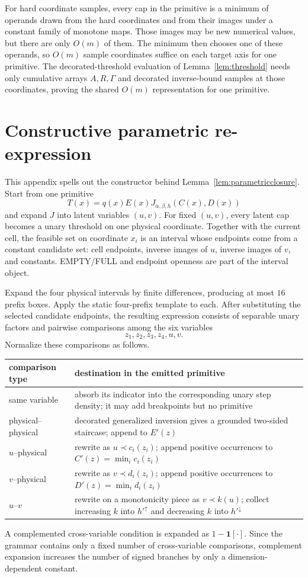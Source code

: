 \documentclass[12pt,a4paper]{article}
\theoremstyle{definition}
\newcommand{\1}{\mathbf 1}
\begin{document}
For hard coordinate samples, every cap in the primitive is a minimum of operands drawn from the hard coordinates and from their images under a constant family of monotone maps.  Those images may be new numerical values, but there are only $O(m)$ of them.  The minimum then chooses one of these operands, so $O(m)$ sample coordinates suffice on each target axis for one primitive. The decorated-threshold evaluation of Lemma~\ref{lem:threshold} needs only cumulative arrays $A,R,\Gamma$ and decorated inverse-bound samples at those coordinates, proving the shared $O(m)$ representation for one primitive.

\section{Constructive parametric re-expression}              \label{app:closure}

This appendix spells out the constructor behind Lemma~\ref{lem:parametricclosure}.  Start from one primitive
\[
T(x)=q(x)E(x)J_{\alpha,\beta,h}(C(x),D(x))
\]
and expand $J$ into latent variables $(u,v)$.  For fixed $(u,v)$, every latent cap becomes a unary threshold on one physical coordinate.  Together with the current cell, the feasible set on coordinate $x_i$ is an interval whose endpoints come from a constant candidate set: cell endpoints, inverse images of $u$, inverse images of $v$, and constants.  EMPTY/FULL and endpoint openness are part of the interval object.

Expand the four physical intervals by finite differences, producing at most $16$ prefix boxes.  Apply the static four-prefix template to each.  After substituting the selected candidate endpoints, the resulting expression consists of separable unary factors and pairwise comparisons among the six variables
\[
z_1,z_2,z_3,z_4,u,v.
\]
Normalize these comparisons as follows.
\begin{center}
\begin{tabular}{p{}p{}}
\toprule
comparison type & destination in the emitted primitive \\
\midrule
same variable & absorb its indicator into the corresponding unary step density; it may add breakpoints but no primitive \\
physical--physical & decorated generalized inversion gives a grounded two-sided staircase; append to $E'(z)$ \\
$u$--physical & rewrite as $u\prec c_i(z_i)$; append positive occurrences to $C'(z)=\min_i c_i(z_i)$ \\
$v$--physical & rewrite as $v\prec d_i(z_i)$; append positive occurrences to $D'(z)=\min_i d_i(z_i)$ \\
$u$--$v$ & rewrite on a monotonicity piece as $v\prec k(u)$; collect increasing $k$ into $h'^{\uparrow}$ and decreasing $k$ into $h'^{\downarrow}$ \\
\bottomrule
\end{tabular}
\end{center}
A complemented cross-variable condition is expanded as $1-\1[\cdot]$.  Since the grammar contains only a fixed number of cross-variable comparisons, complement expansion increases the number of signed branches by only a dimension-dependent constant.
\end{document}
